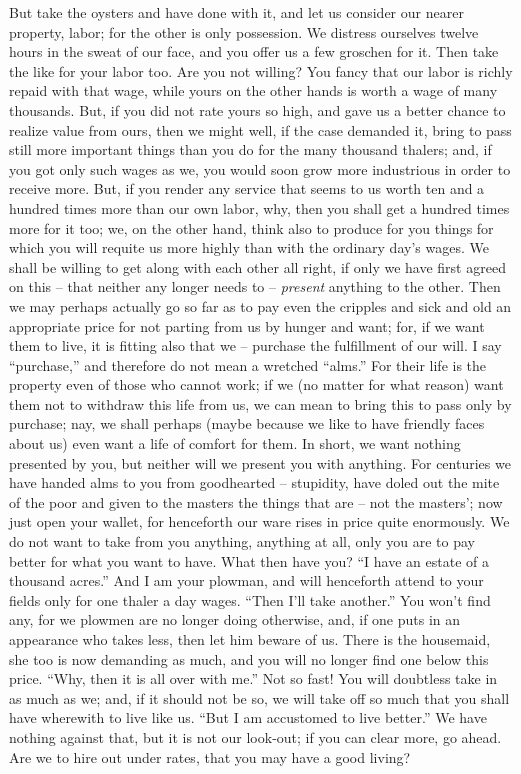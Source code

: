 \documentclass[12pt,a4paper]{book}
\begin{document}
But take the oysters and have done with it, and let us consider our nearer 
property, labor; for the other is only possession. We distress ourselves 
twelve hours in the sweat of our face, and you offer us a few groschen for it. 
Then take the like for your labor too. Are you not willing? You fancy that our 
labor is richly repaid with that wage, while yours on the other hands is worth 
a wage of many thousands. But, if you did not rate yours so high, and gave us 
a better chance to realize value from ours, then we might well, if the case 
demanded it, bring to pass still more important things than you do for the 
many thousand thalers; and, if you got only such wages as we, you would soon 
grow more industrious in order to receive more. But, if you render any service 
that seems to us worth ten and a hundred times more than our own labor, why, 
then you shall get a hundred times more for it too; we, on the other hand, 
think also to produce for you things for which you will requite us more highly 
than with the ordinary day's wages. We shall be willing to get along with each 
other all right, if only we have first agreed on this -- that neither any 
longer needs to -- \textit{present} anything to the other. Then we may perhaps 
actually go so far as to pay even the cripples and sick and old an appropriate 
price for not parting from us by hunger and want; for, if we want them to 
live, it is fitting also that we -- purchase the fulfillment of our will. I 
say ``purchase,'' and therefore do not mean a wretched ``alms.'' For their 
life is the property even of those who cannot work; if we (no matter for what 
reason) want them not to withdraw this life from us, we can mean to bring this 
to pass only by purchase; nay, we shall perhaps (maybe because we like to have 
friendly faces about us) even want a life of comfort for them. In short, we 
want nothing presented by you, but neither will we present you with anything. 
For centuries we have handed alms to you from goodhearted -- stupidity, have 
doled out the mite of the poor and given to the masters the things that are -- 
not the masters'; now just open your wallet, for henceforth our ware rises in 
price quite enormously. We do not want to take from you anything, anything at 
all, only you are to pay better for what you want to have. What then have you? 
``I have an estate of a thousand acres.'' And I am your plowman, and will 
henceforth attend to your fields only for one thaler a day wages. ``Then I'll 
take another.'' You won't find any, for we plowmen are no longer doing 
otherwise, and, if one puts in an appearance who takes less, then let him 
beware of us. There is the housemaid, she too is now demanding as much, and 
you will no longer find one below this price. ``Why, then it is all over with 
me.'' Not so fast! You will doubtless take in as much as we; and, if it 
should not be so, we will take off so much that you shall have wherewith to 
live like us. ``But I am accustomed to live better.'' We have nothing 
against that, but it is not our look-out; if you can clear more, go ahead. Are 
we to hire out under rates, that you may have a good living?
\end{document}

